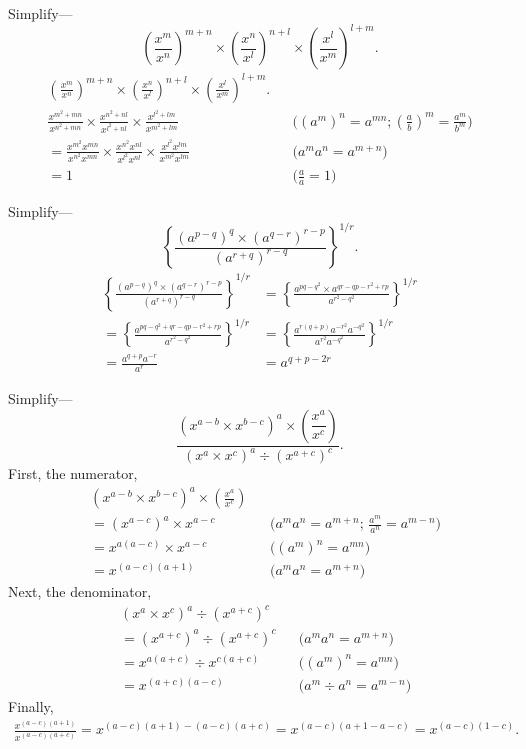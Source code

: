 \documentclass[DIN, pagenumber=false, fontsize=11pt, parskip=half]{scrartcl}
\begin{document}
\begin{problems}[from=1,step=1]
    \problem Simplify---
    \[
        \left(\frac{x^m}{x^n}\right)^{m+n} \times \left(\frac{x^n}{x^l}\right)^{n+l} \times \left(\frac{x^l}{x^m}\right)^{l+m}.
    \]
    \answer 
    \begin{align*}
        \left(\frac{x^m}{x^n}\right)^{m+n} \times \left(\frac{x^n}{x^l}\right)^{n+l} \times \left(\frac{x^l}{x^m}\right)^{l+m}. & \\ 
        \frac{x^{m^2+mn}}{x^{n^2+mn}} \times \frac{x^{n^2+nl}}{x^{l^2+nl}} \times \frac{x^{l^2+lm}}{x^{m^2+lm}} && \text{($(a^m)^n = a^{mn}; (\tfrac{a}{b})^m = \tfrac{a^m}{b^m}$)}\\ 
        = \frac{x^{m^2}x^{mn}}{x^{n^2}x^{mn}} \times \frac{x^{n^2}x^{nl}}{x^{l^2}x^{nl}} \times \frac{x^{l^2}x^{lm}}{x^{m^2}x^{lm}}  && \text{($a^ma^n = a^{m+n}$)} \\ 
        = 1 && \text{($\tfrac{a}{a} = 1$)} 
    \end{align*}

    \problem Simplify---
    \[
        \left\{ \frac{(a^{p-q})^{q} \times (a^{q-r})^{r-p}}{(a^{r+q})^{r-q}} \right\}^{1/r}.
    \]
    \answer 
    \begin{align*}
        \left\{ \frac{(a^{p-q})^{q} \times (a^{q-r})^{r-p}}{(a^{r+q})^{r-q}} \right\}^{1/r} & 
        = \left\{ \frac{a^{pq-q^2} \times a^{qr-qp-r^2+rp}}{a^{r^2-q^2}} \right\}^{1/r}\\ 
        = \left\{\frac{a^{pq-q^2+qr-qp-r^2+rp}}{a^{r^2-q^2}}\right\}^{1/r} &
        = \left\{\frac{a^{r(q+p)}a^{-r^2}a^{-q^2}}{a^{r^2}a^{-q^2}}\right\}^{1/r}\\ 
        = \frac{a^{q+p}a^{-r}}{a^r} &
        = a^{q+p-2r}
    \end{align*}

    \problem Simplify---
    \[
        \frac{(x^{a-b} \times x^{b-c})^{a} \times \left(\dfrac{x^a}{x^c}\right)}{(x^a \times x^c)^{a} \div (x^{a+c})^{c}}.
    \]
    \answer 
    First, the numerator,
    \begin{align*}
        &(x^{a-b}\times x^{b-c})^a \times \left(\frac{x^a}{x^c}\right) \\ 
        &= (x^{a-c})^a \times x^{a-c} && \text{($a^ma^n = a^{m+n}$; $\tfrac{a^m}{a^n} = a^{m-n}$)}\\ 
        &= x^{a(a-c)} \times x^{a-c} && \text{($(a^m)^n = a^{mn}$)}\\ 
        &= x^{(a-c)(a+1)} && \text{($a^ma^n = a^{m+n}$)}
    \end{align*}
    Next, the denominator,
    \begin{align*}
        &(x^a \times x^c)^a \div (x^{a+c})^c \\ 
        &= (x^{a+c})^a \div (x^{a+c})^c && \text{($a^ma^n = a^{m+n}$)}\\ 
        &= x^{a(a+c)} \div x^{c(a+c)} && \text{($(a^m)^n = a^{mn}$)}\\ 
        &= x^{(a+c)(a-c)} && \text{($a^m \div a^n = a^{m-n}$)}
    \end{align*}
    Finally,
    \begin{align*}
        \frac{x^{(a-c)(a+1)}}{x^{(a-c)(a+c)}} = x^{(a-c)(a+1) - (a-c)(a+c)} = x^{(a-c)(a+1-a-c)} = x^{(a-c)(1-c)}.
    \end{align*}


\end{problems}
\end{document}
